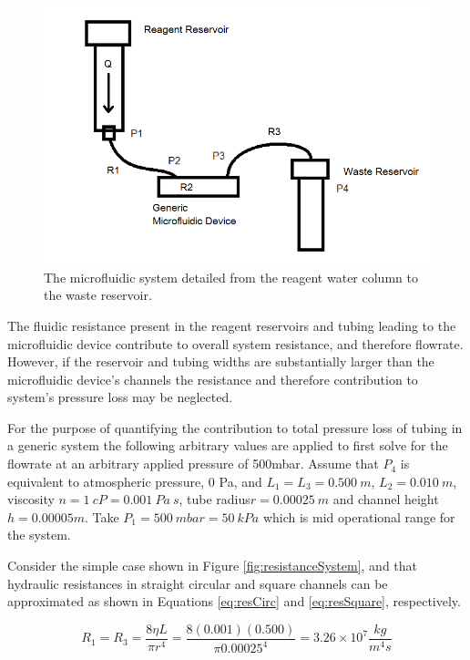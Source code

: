 \begin{figure}[H]
\centering 
\includegraphics[width=01.0\columnwidth]{resistanceSystem.PNG} 
\caption[Hydraulic Resistance of System]{The microfluidic system detailed from the reagent water column to the waste reservoir.} %
\label{fig:resistanceSystem} 
\end{figure}

The fluidic resistance present in the reagent reservoirs and tubing leading to the microfluidic device contribute to overall system resistance, and therefore flowrate. However, if the reservoir and tubing widths are substantially larger than the microfluidic device's channels the resistance and therefore contribution to system's pressure loss may be neglected.

For the purpose of quantifying the contribution to total pressure loss of tubing in a generic system the following arbitrary values are applied to first solve for the flowrate at an arbitrary applied pressure of 500mbar. Assume that $P_4$ is equivalent to atmospheric pressure, 0 Pa, and $L_1=L_3= 0.500 \ m$, $L_2=0.010 \ m$, viscosity $n=1 \ cP = 0.001 \ Pa \ s$, tube radius$r=0.00025 \ m$ and channel height $h=0.00005m$. Take $P_1 = 500 \ mbar = 50 \ kPa$ which is mid operational range for the system.

Consider the simple case shown in Figure \vref{fig:resistanceSystem}, and that hydraulic resistances in straight circular and square channels can be approximated as shown in Equations \vref{eq:resCirc} and \vref{eq:resSquare}, respectively.

\begin{equation}
R_1 = R_3 = \frac{8 \eta L}{\pi r^4}= \frac{8 (0.001) (0.500)}{\pi 0.00025^4} = 3.26  \times 10^7 \frac{kg}{m^4s}
\label{eq:resCirc}
\end{equation}

